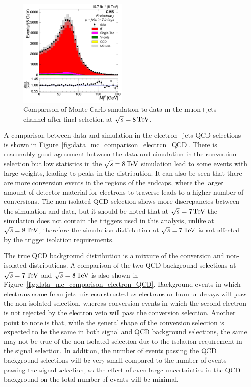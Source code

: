 \begin{figure}[hbtp]
     \includegraphics[width=0.48\textwidth]{Chapters/04_Analysis/04b_XSections/images/control_plots/before_fit/8TeV/MuPlusJets_patType1CorrectedPFMet_MT_2orMoreBtags_with_ratio.pdf}\hfill
     \caption{Comparison of Monte Carlo simulation to data in the muon+jets channel after final
     selection at $\sqrt{s}=8\,\text{Te\hspace{-.08em}V}$.}
     \label{fig:data_mc_comparison_8TeV_muon}
\end{figure}

A comparison between data and simulation in the electron+jets QCD selections is shown in
Figure~\ref{fig:data_mc_comparison_electron_QCD}. There is reasonably good agreement between the data and
simulation in the conversion selection but low statistics in the $\sqrt{s}=8\,\text{Te\hspace{-.08em}V}$ simulation lead to some
events with large weights, leading to peaks in the distribution. It can also be seen that there are more
conversion events in the regions of the endcaps, where the larger amount of detector material for electrons to
traverse leads to a higher number of conversions. The non-isolated QCD selection shows more discrepancies
between the simulation and data, but it should be noted that at $\sqrt{s}=7\,\text{Te\hspace{-.08em}V}$ the simulation does not
contain the triggers used in this analysis, unlike at $\sqrt{s}=8\,\text{Te\hspace{-.08em}V}$, therefore the simulation distirbution
at $\sqrt{s}=7\,\text{Te\hspace{-.08em}V}$ is not affected by the trigger isolation requirements.

The true QCD background distribution is a mixture of the conversion and non-isolated distributions. A
comparison of the two QCD background selections at $\sqrt{s}=7\,\text{Te\hspace{-.08em}V}$ and $\sqrt{s}=8\,\text{Te\hspace{-.08em}V}$ is also shown in
Figure~\ref{fig:data_mc_comparison_electron_QCD}. Background events in which electrons come from jets
misreconstructed as electrons or from \bquark or \cquark decays will pass the non-isolated selection, whereas
conversion events in which the second electron is not rejected by the electron veto will pass the conversion
selection. Another point to note is that, while the general shape of the conversion selection is expected to
be the same in both signal and QCD background selections, the same may not be true of the non-isolated
selection due to the isolation requirement in the signal selection. In addition, the number of events passing
the QCD background selections will be very small compared to the number of events passing the signal
selection, so the effect of even large uncertainties in the QCD background on the total number of events
will be minimal.

